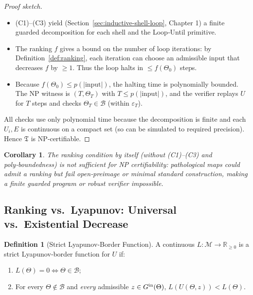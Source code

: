 \documentclass[12pt]{article}
\theoremstyle{definition}
\newtheorem{definition}{Definition}[section]
\theoremstyle{plain}
\newtheorem{corollary}{Corollary}[section]
\begin{document}
\begin{proof}[Proof sketch]
\begin{itemize}
  \item (C1)–(C3) yield (Section~\ref{sec:inductive-shell-loop}, Chapter 1) a finite guarded decomposition for each shell and the Loop‑Until primitive.
  \item The ranking $f$ gives a bound on the number of loop iterations: by Definition~\ref{def:ranking}, each iteration can choose an admissible input that decreases $f$ by $\ge1$.  Thus the loop halts in $\le f(\Theta_0)$ steps.
  \item Because $f(\Theta_0)\le p(|\text{input}|)$, the halting time is polynomially bounded.  The NP witness is $(T,\Theta_T)$ with $T\le p(|\text{input}|)$, and the verifier replays $U$ for $T$ steps and checks $\Theta_T\in\mathcal B$ (within $\varepsilon_T$).
\end{itemize}
All checks use only polynomial time because the decomposition is finite and each $U_i,E$ is continuous on a compact set (so can be simulated to required precision).  Hence $\mathfrak T$ is NP‑certifiable.
\end{proof}

\begin{corollary}
\label{cor:ranking-not-enough}
The ranking condition by itself (without (C1)–(C3) and poly‑boundedness) is \emph{not} sufficient for NP certifiability: pathological maps could admit a ranking but fail open‑preimage or minimal standard construction, making a finite guarded program or robust verifier impossible.
\end{corollary}

\subsection{Ranking vs.\ Lyapunov: Universal vs.\ Existential Decrease}
\label{subsec:ranking-vs-lyapunov}

\begin{definition}[Strict Lyapunov‑Border Function]
A continuous $L:\mathcal M\to\mathbb R_{\ge0}$ is a strict Lyapunov‑border function for $U$ if:
\begin{enumerate}
  \item $L(\Theta)=0 \iff \Theta\in\mathcal B$;
  \item For every $\Theta\notin\mathcal B$ and \emph{every} admissible $z\in G^{\rm in}(\Theta)$,
        $L(U(\Theta,z))<L(\Theta)$.
\end{enumerate}
\end{definition}
\end{document}
